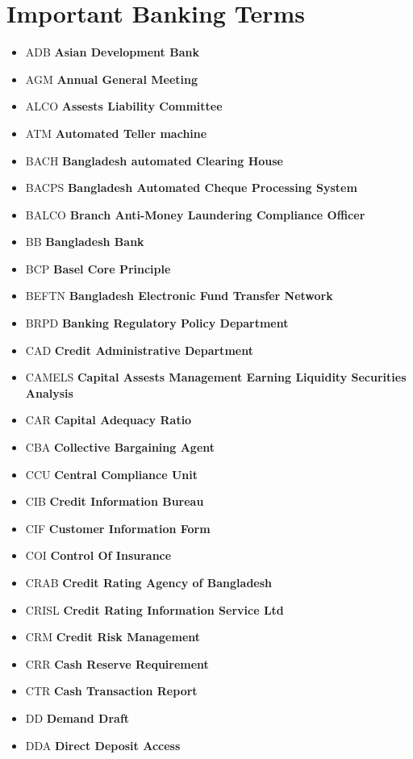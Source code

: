 \documentclass[11pt]{article}
\begin{document}
\section{Important Banking Terms}
\label{sec:org1b8b09c}

\begin{itemize}
\item ADB \textbf{Asian Development Bank}
\item AGM  \textbf{Annual General Meeting}
\item ALCO \textbf{Assests Liability Committee}
\item ATM \textbf{Automated Teller machine}
\item BACH \textbf{Bangladesh automated Clearing House}
\item BACPS \textbf{Bangladesh Automated Cheque Processing System}
\item BALCO \textbf{Branch Anti-Money Laundering Compliance Officer}
\item BB \textbf{Bangladesh Bank}
\item BCP  \textbf{Basel Core Principle}
\item BEFTN \textbf{Bangladesh Electronic Fund Transfer Network}
\item BRPD \textbf{Banking Regulatory Policy Department}
\item CAD \textbf{Credit Administrative Department}
\item CAMELS \textbf{Capital Assests Management Earning Liquidity Securities Analysis}
\item CAR \textbf{Capital Adequacy Ratio}
\item CBA \textbf{Collective Bargaining Agent}
\item CCU \textbf{Central Compliance Unit}
\item CIB \textbf{Credit Information Bureau}
\item CIF \textbf{Customer Information Form}
\item COI \textbf{Control Of Insurance}
\item CRAB \textbf{Credit Rating Agency of Bangladesh}
\item CRISL \textbf{Credit Rating Information Service Ltd}
\item CRM  \textbf{Credit Risk Management}
\item CRR \textbf{Cash Reserve Requirement}
\item CTR  \textbf{Cash Transaction Report}
\item DD \textbf{Demand Draft}
\item DDA \textbf{Direct Deposit Access}

\end{itemize}
\end{document}
